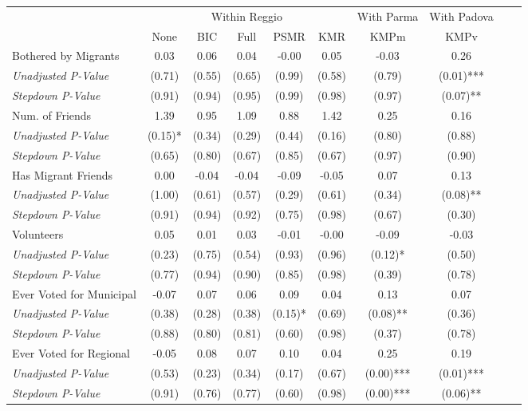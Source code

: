 \begin{tabular}{l c c c c c c c c c}
\toprule
& \multicolumn{5}{c}{Within Reggio} & With Parma & With Padova \\\cmidrule(lr){2-6} \cmidrule(lr){7} \cmidrule(lr){8}
 & None & BIC & Full & PSMR & KMR & KMPm & KMPv \\
\midrule
Bothered by Migrants & 0.03 & 0.06 & 0.04 & -0.00 & 0.05 & -0.03 & 0.26 \\
\quad \textit{Unadjusted P-Value} & (0.71) & (0.55) & (0.65) & (0.99) & (0.58) & (0.79) & (0.01)*** \\
\quad \textit{Stepdown P-Value} & (0.91) & (0.94) & (0.95) & (0.99) & (0.98) & (0.97) & (0.07)** \\
Num. of Friends & 1.39 & 0.95 & 1.09 & 0.88 & 1.42 & 0.25 & 0.16 \\
\quad \textit{Unadjusted P-Value} & (0.15)* & (0.34) & (0.29) & (0.44) & (0.16) & (0.80) & (0.88) \\
\quad \textit{Stepdown P-Value} & (0.65) & (0.80) & (0.67) & (0.85) & (0.67) & (0.97) & (0.90) \\
Has Migrant Friends & 0.00 & -0.04 & -0.04 & -0.09 & -0.05 & 0.07 & 0.13 \\
\quad \textit{Unadjusted P-Value} & (1.00) & (0.61) & (0.57) & (0.29) & (0.61) & (0.34) & (0.08)** \\
\quad \textit{Stepdown P-Value} & (0.91) & (0.94) & (0.92) & (0.75) & (0.98) & (0.67) & (0.30) \\
Volunteers & 0.05 & 0.01 & 0.03 & -0.01 & -0.00 & -0.09 & -0.03 \\
\quad \textit{Unadjusted P-Value} & (0.23) & (0.75) & (0.54) & (0.93) & (0.96) & (0.12)* & (0.50) \\
\quad \textit{Stepdown P-Value} & (0.77) & (0.94) & (0.90) & (0.85) & (0.98) & (0.39) & (0.78) \\
Ever Voted for Municipal & -0.07 & 0.07 & 0.06 & 0.09 & 0.04 & 0.13 & 0.07 \\
\quad \textit{Unadjusted P-Value} & (0.38) & (0.28) & (0.38) & (0.15)* & (0.69) & (0.08)** & (0.36) \\
\quad \textit{Stepdown P-Value} & (0.88) & (0.80) & (0.81) & (0.60) & (0.98) & (0.37) & (0.78) \\
Ever Voted for Regional & -0.05 & 0.08 & 0.07 & 0.10 & 0.04 & 0.25 & 0.19 \\
\quad \textit{Unadjusted P-Value} & (0.53) & (0.23) & (0.34) & (0.17) & (0.67) & (0.00)*** & (0.01)*** \\
\quad \textit{Stepdown P-Value} & (0.91) & (0.76) & (0.77) & (0.60) & (0.98) & (0.00)*** & (0.06)** \\
\bottomrule
\end{tabular}
